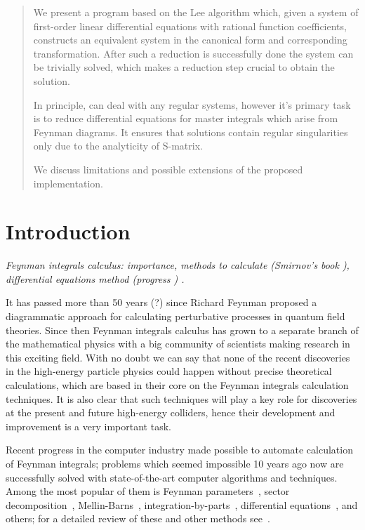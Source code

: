 \documentclass[12pt,a4paper]{article}
\begin{document}
\maketitle
\thispagestyle{empty}

\begin{abstract}
We present a program \fuchsia based on the Lee algorithm \cite{Lee15} which, given a system of first-order linear differential equations with rational function coefficients, constructs an equivalent system in the canonical form and corresponding transformation.
After such a reduction is successfully done the system can be trivially solved, which makes a reduction step crucial to obtain the solution.

In principle, \fuchsia can deal with any regular systems, however it's primary task is to reduce differential equations for master integrals which arise from Feynman diagrams.
It ensures that solutions contain regular singularities only due to the analyticity of S-matrix.

We discuss limitations and possible extensions of the proposed implementation.
\end{abstract}
\newpage


\newpage

\tableofcontents

\section{Introduction}

{\it Feynman integrals calculus: importance, methods to calculate (Smirnov's book \cite{Smi06}), differential equations method (progress \cite{Henn14}) .}

It has passed more than 50 years (?) since Richard Feynman proposed a diagrammatic approach for calculating perturbative processes in quantum field theories.
Since then Feynman integrals calculus has grown to a separate branch of the mathematical physics with a big community of scientists making research in this exciting field.
With no doubt we can say that none of the recent discoveries in the high-energy particle physics could happen without precise theoretical calculations, which are based in their core on the Feynman integrals calculation techniques. 
It is also clear that such techniques will play a key role for discoveries at the present and future high-energy colliders, hence their development and improvement is a very important task.

Recent progress in the computer industry made possible to automate calculation of Feynman integrals; problems which seemed impossible 10 years ago now are successfully solved with state-of-the-art computer algorithms and techniques.
Among the most popular of them is Feynman parameters~\cite{}, sector decomposition~\cite{}, Mellin-Barns~\cite{}, integration-by-parts~\cite{}, differential equations~\cite{}, and others; for a detailed review of these and other methods see~\cite{Smi06}.
\end{document}
